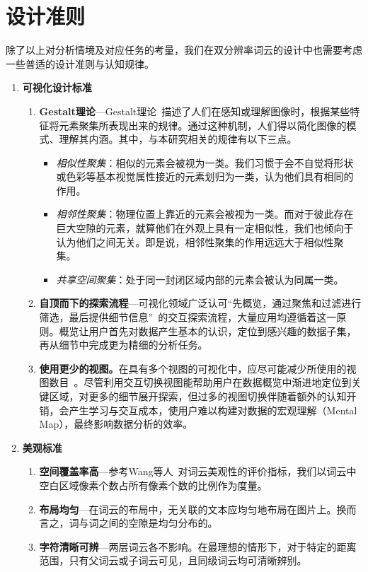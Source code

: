 \section{设计准则}

除了以上对分析情境及对应任务的考量，我们在双分辨率词云的设计中也需要考虑一些普适的设计准则与认知规律。
\begin{enumerate}[leftmargin=*]
	\renewcommand{\labelenumi}{\textbf{P\theenumi.}}
	\renewcommand{\labelenumii}{\textbf{ P\theenumi.\arabic{enumii}}}
	\item \textbf{可视化设计标准}
		\begin{enumerate}
		\item \textbf{Gestalt理论}---Gestalt理论~\supercite{Wagemans2012ACO}描述了人们在感知或理解图像时，根据某些特征将元素聚集所表现出来的规律。通过这种机制，人们得以简化图像的模式、理解其内涵。其中，与本研究相关的规律有以下三点。
		\begin{itemize}
			\item \textit{相似性聚集}：相似的元素会被视为一类。我们习惯于会不自觉将形状或色彩等基本视觉属性接近的元素划归为一类，认为他们具有相同的作用。
			\item \textit{相邻性聚集}：物理位置上靠近的元素会被视为一类。而对于彼此存在巨大空隙的元素，就算他们在外观上具有一定相似性，我们也倾向于认为他们之间无关。即是说，相邻性聚集的作用远远大于相似性聚集。
			\item \textit{共享空间聚集}：处于同一封闭区域内部的元素会被认为同属一类。
		\end{itemize}
		\item \textbf{自顶而下的探索流程}---可视化领域广泛认可``先概览，通过聚焦和过滤进行筛选，最后提供细节信息''~\supercite{Shneiderman96}的交互探索流程，大量应用均遵循着这一原则。概览让用户首先对数据产生基本的认识，定位到感兴趣的数据子集，再从细节中完成更为精细的分析任务。
		\item \textbf{使用更少的视图。}在具有多个视图的可视化中，应尽可能减少所使用的视图数目~\supercite{Baldonado2000}。尽管利用交互切换视图能帮助用户在数据概览中渐进地定位到关键区域，对更多的细节展开探索，但过多的视图切换伴随着额外的认知开销，会产生学习与交互成本，使用户难以构建对数据的宏观理解（Mental Map），最终影响数据分析的效率。
	\end{enumerate}
	\item \textbf{美观标准}
			\begin{enumerate}
	\item \textbf{空间覆盖率高}---参考Wang等人~\supercite{Wang2020}对词云美观性的评价指标，我们以词云中空白区域像素个数占所有像素个数的比例作为度量。
		\item \textbf{布局均匀}---在词云的布局中，无关联的文本应均匀地布局在图片上。换而言之，词与词之间的空隙是均匀分布的。
		\item \textbf{字符清晰可辨}---两层词云各不影响。在最理想的情形下，对于特定的距离范围，只有父词云或子词云可见，且同级词云均可清晰辨别。
	\end{enumerate}
\end{enumerate}

